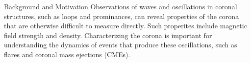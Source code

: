 \documentclass{beamer}
\begin{document}

\begin{frame}{Background and Motivation}
    Observations of waves and oscillations in coronal structures, such as loops
    and prominances, can reveal properties of the corona that are otherwise
    difficult to measure directly. Such properites include magnetic field
    strength and density. Characterizing the corona is important for
    understanding the dynamics of events that produce these oscillations, such
    as flares and coronal mass ejections (CMEs).
\end{frame}

\end{document}
